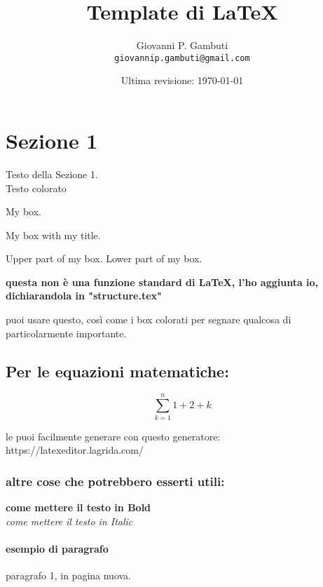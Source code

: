 \documentclass[12pt]{article}
\title{Template di \LaTeX}
\author{Giovanni P. Gambuti \\ \texttt{giovannip.gambuti@gmail.com}}
\date{Ultima revisione:  \today}
\begin{document}
\maketitle %

\tableofcontents
\thispagestyle{empty}
\newpage
\setcounter{page}{1}

\section{Sezione 1}
Testo della Sezione 1. \\ \textcolor{warmblack}{Testo colorato}

\hfill

\begin{tcolorbox}[colback=red!5!white,colframe=red!75!black]
  My box.
\end{tcolorbox}

\begin{tcolorbox}[colback=blue!5!white,colframe=blue!75!black,title=My title]
  My box with my title.
\end{tcolorbox}

\begin{tcolorbox}[colback=green!5!white,colframe=green!75!black]
  Upper part of my box.
  \tcblower
  Lower part of my box.
\end{tcolorbox}


\begin{warn}
\textbf{questa non è una funzione standard di LaTeX, l'ho aggiunta io, dichiarandola in "structure.tex"}

puoi usare questo, così come i box colorati per segnare qualcosa di particolarmente importante. 
\end{warn}

\subsection{Per le equazioni matematiche:}

\begin{equation}
\sum_{k=1}^{n} 1+2+k
\end{equation}

le puoi facilmente generare con questo generatore: https://latexeditor.lagrida.com/

\subsubsection{altre cose che potrebbero esserti utili:}

\textbf{come mettere il testo in Bold} \\
\textit{come mettere il testo in Italic} \\


\clearpage %

\paragraph{esempio di paragrafo} paragrafo 1, in pagina nuova.
\end{document}
